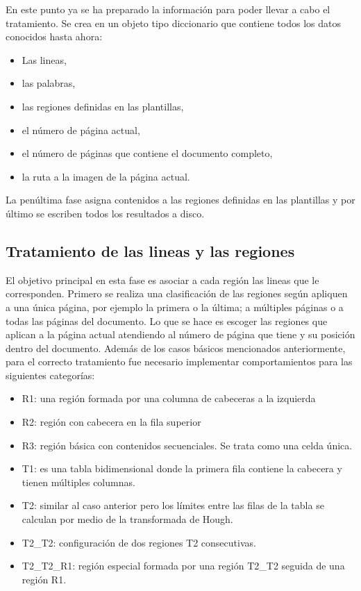 En este punto ya se ha preparado la información para poder llevar a cabo el tratamiento. Se crea en un objeto tipo diccionario que contiene todos los datos conocidos hasta ahora:

\begin{itemize}
	\item Las lineas,
	\item las palabras,
	\item las regiones definidas en las plantillas,
	\item el número de página actual,
	\item el número de páginas que contiene el documento completo,
	\item la ruta a la imagen de la página actual.
\end{itemize}

La penúltima fase asigna contenidos a las regiones definidas en las plantillas y por último se escriben todos los resultados a disco.

\subsection{Tratamiento de las lineas y las regiones}

El objetivo principal en esta fase es asociar a cada región las lineas que le corresponden. Primero se realiza una clasificación de las regiones según apliquen a una única página, por ejemplo la primera o la última; a múltiples páginas o a todas las páginas del documento. Lo que se hace es escoger las regiones que aplican a la página actual atendiendo al número de página que tiene y su posición dentro del documento. Además de los casos básicos mencionados anteriormente, para el correcto tratamiento fue necesario implementar comportamientos para las siguientes categorías: 

\begin{itemize}
	\item R1: una región formada por una columna de cabeceras a la izquierda
	\item R2: región con cabecera en la fila superior
	\item R3: región básica con contenidos secuenciales. Se trata como una celda única.
	\item T1: es una tabla bidimensional donde la primera fila contiene la cabecera y tienen múltiples columnas.
	\item T2: similar al caso anterior pero los límites entre las filas de la tabla se calculan por medio de la transformada de Hough.
	\item T2_T2: configuración de dos regiones T2 consecutivas.
	\item T2_T2_R1: región especial formada por una región T2_T2 seguida de una región R1.
\end{itemize}

